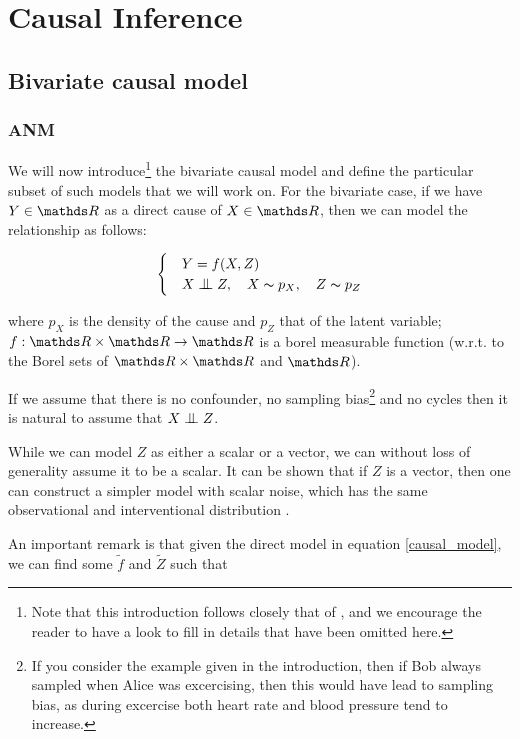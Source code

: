 \chapter{Causal Inference}

\section{Bivariate causal model}

\subsection{ANM}

We will now introduce\footnote{Note that this introduction follows closely that of \cite{Mooij2016jmlr}, and 
we encourage the reader to have a look to fill in details that have been omitted here.} 
the bivariate causal model and define the particular subset of such models that 
we will work on. For the bivariate case, if we have $Y \in \R$ as a direct cause of $X \in \R$, then we can model 
the relationship as follows:

\begin{equation}
    \begin{cases} 
        & Y = f(X, Z) \\
        & X \bigCI Z,\quad X \thicksim p_X,\quad Z \thicksim p_{Z}  
     \end{cases}
     \label{causal_model}
\end{equation}

where $p_X$ is the density of the cause and $p_Z$ that of the latent variable; $f: \R \times \R \rightarrow \R$
is a borel measurable function (w.r.t. to the Borel sets of $\R \times \R$ and $\R$). 

If we assume that there is no confounder, no sampling bias\footnote{If you consider the 
example given in the introduction, then if Bob always sampled when Alice was excercising, then this 
would have lead to sampling bias, as during excercise both heart rate and blood pressure tend to increase.} 
and no cycles then it is natural to assume that $X \bigCI Z$.

While we can model $Z$ as either a scalar or a vector, we can without loss of generality assume it to be a scalar.
It can be shown that if $Z$ is a vector, then one can construct a simpler model with scalar noise, which has the 
same observational and interventional distribution \cite{Mooij2016jmlr}.

An important remark is that given the direct model in equation \ref{causal_model}, we can find some 
$\tilde{f}$ and $\tilde{Z}$ such that


